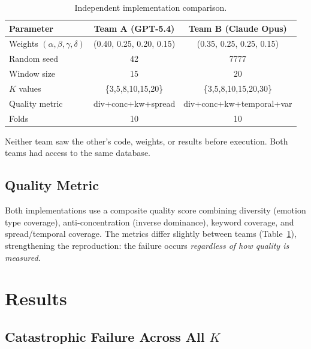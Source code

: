 \documentclass[11pt,a4paper]{article}
\begin{document}
\begin{table}[h]
\centering
\caption{Independent implementation comparison.}
\label{tab:implementations}
\small
\begin{tabular}{@{}lcc@{}}
\toprule
\textbf{Parameter} & \textbf{Team A (GPT-5.4)} & \textbf{Team B (Claude Opus)} \\
\midrule
Weights $(\alpha,\beta,\gamma,\delta)$ & (0.40, 0.25, 0.20, 0.15) & (0.35, 0.25, 0.25, 0.15) \\
Random seed & 42 & 7777 \\
Window size & 15 & 20 \\
$K$ values & \{3,5,8,10,15,20\} & \{3,5,8,10,15,20,30\} \\
Quality metric & div+conc+kw+spread & div+conc+kw+temporal+var \\
Folds & 10 & 10 \\
\bottomrule
\end{tabular}
\end{table}

Neither team saw the other's code, weights, or results before execution. Both teams had access to the same database.

\subsection{Quality Metric}

Both implementations use a composite quality score combining diversity (emotion type coverage), anti-concentration (inverse dominance), keyword coverage, and spread/temporal coverage. The metrics differ slightly between teams (Table~\ref{tab:implementations}), strengthening the reproduction: the failure occurs \emph{regardless of how quality is measured}.

\section{Results}

\subsection{Catastrophic Failure Across All $K$}
\end{document}
